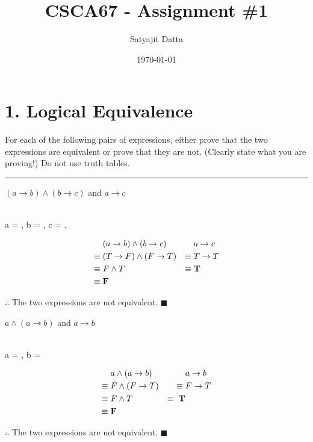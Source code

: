 \documentclass[]{article}
\title{\textbf{CSCA67 - Assignment \#1}}
\author{ Satyajit Datta }
\date{\today}
\newcommand\bb[1]{\textcolor{yorhafg}{\textbf{#1}}}
\begin{document}
\maketitle    

\section*{1. Logical Equivalence}
For each of the following pairs of expressions, either prove that the two expressions are equivalent or prove that
they are not. (Clearly state what you are proving!) Do not use truth tables.
\vspace{1em}
\hrule
\vspace{1em}

\begin{question}
    $(a \rightarrow b) \land (b \rightarrow c)$ and $a \rightarrow c$
\end{question}
\begin{center}
         \\
         a = , b = , c = . \\
\end{center}
\begin{align*}
    & (a \rightarrow b) \land (b \rightarrow c) & & a \rightarrow c\\
    \equiv\; & (T \rightarrow F) \land (F \rightarrow T) & \equiv\; & T \rightarrow T\\
    \equiv\; & F \land T & \equiv\; & \bb{T}\\
    \equiv\; & \bb{F} && \\
\end{align*}
\begin{center}
    $\therefore$ The two expressions are not equivalent. $\blacksquare$
\end{center}

\begin{question}
    $a \land (a \rightarrow b)$ and $a \rightarrow b$
\end{question}
\begin{center}
     \\
     a = , b = 
\end{center}
\begin{align*}
    & a \land (a \rightarrow b) &  & a \rightarrow b \\
    \equiv\; & F \land (F \rightarrow T)  & \equiv\; & F \rightarrow T\\
    \equiv\; & F \land T & \equiv\; \bb{T} \\
    \equiv\; & \bb{F}
\end{align*}
\begin{center}
    $\therefore$ The two expressions are not equivalent. $\blacksquare$
\end{center}
\end{document}
